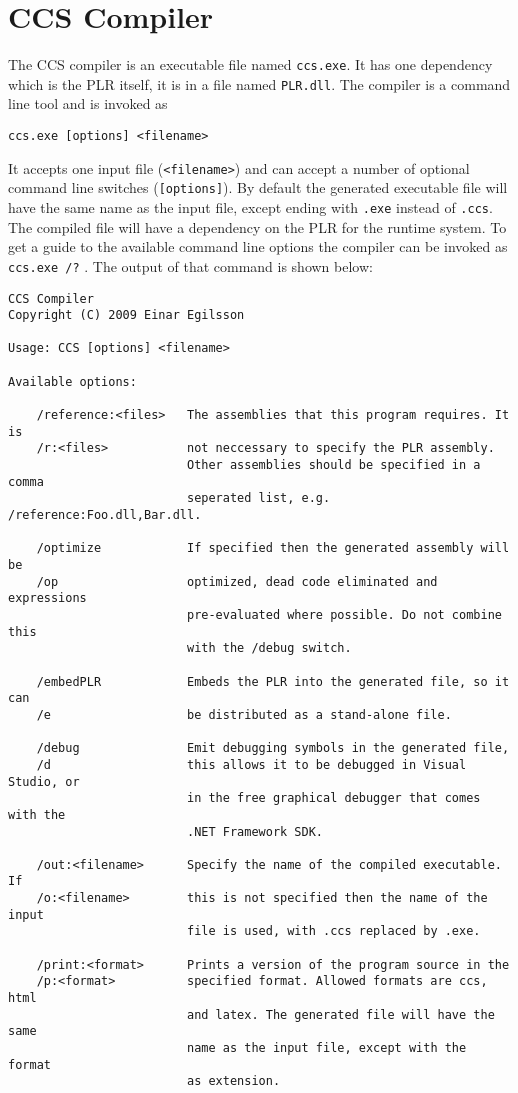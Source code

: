 \section{CCS Compiler}

  The CCS compiler is an executable file named \texttt{ccs.exe}. It has one
  dependency which is the PLR itself, it is in a file named \texttt{PLR.dll}.
  The compiler is a command line tool and is invoked as 
  \begin{verbatim}ccs.exe [options] <filename>\end{verbatim} It accepts one 
  input file (\texttt{<filename>}) and can accept a number of optional command 
  line switches (\texttt{[options]}). By default the generated executable file 
  will have the same name as the input file, except ending with \texttt{.exe} 
  instead of \texttt{.ccs}. The compiled file will have a dependency on the 
  PLR for the runtime system. To get a guide to the available command line 
  options the compiler can be invoked as \texttt{ccs.exe /?} . The output of 
  that command is shown below:
	\begin{footnotesize}
	\begin{verbatim}
CCS Compiler
Copyright (C) 2009 Einar Egilsson

Usage: CCS [options] <filename>

Available options:

    /reference:<files>   The assemblies that this program requires. It is
    /r:<files>           not neccessary to specify the PLR assembly.
                         Other assemblies should be specified in a comma
                         seperated list, e.g. /reference:Foo.dll,Bar.dll.

    /optimize            If specified then the generated assembly will be
    /op                  optimized, dead code eliminated and expressions
                         pre-evaluated where possible. Do not combine this
                         with the /debug switch.

    /embedPLR            Embeds the PLR into the generated file, so it can
    /e                   be distributed as a stand-alone file.
  
    /debug               Emit debugging symbols in the generated file,
    /d                   this allows it to be debugged in Visual Studio, or
                         in the free graphical debugger that comes with the
                         .NET Framework SDK.

    /out:<filename>      Specify the name of the compiled executable. If
    /o:<filename>        this is not specified then the name of the input
                         file is used, with .ccs replaced by .exe.

    /print:<format>      Prints a version of the program source in the
    /p:<format>          specified format. Allowed formats are ccs, html
                         and latex. The generated file will have the same
                         name as the input file, except with the format
                         as extension.	
\end{verbatim}
\end{footnotesize}  
  
